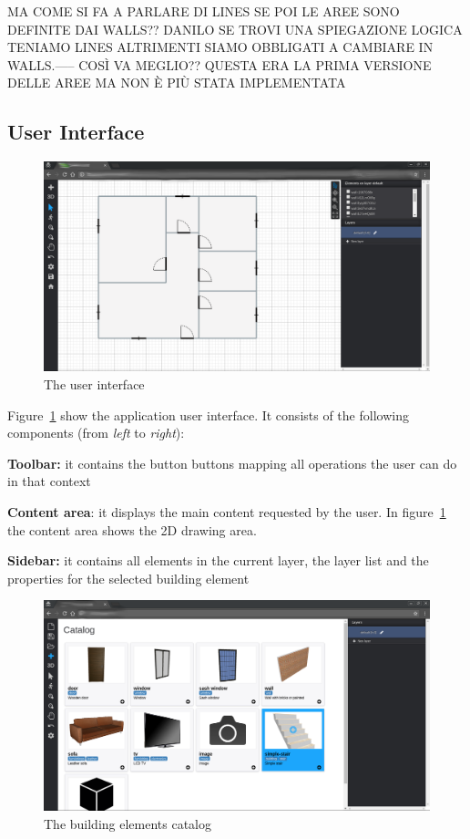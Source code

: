 MA COME SI FA A PARLARE DI LINES SE POI LE AREE SONO DEFINITE DAI WALLS?? DANILO SE TROVI UNA SPIEGAZIONE LOGICA TENIAMO LINES ALTRIMENTI SIAMO OBBLIGATI A CAMBIARE IN WALLS.----- COS\`I VA MEGLIO?? QUESTA ERA LA PRIMA VERSIONE DELLE AREE MA NON \`E PI\`U STATA IMPLEMENTATA


\subsection{User Interface}\label{ssec:ui}

\begin{figure}[htb]
\centering
\includegraphics[width=\linewidth]{contents/images/fig2d}
\caption{The user interface}
\label{fig2D}
\end{figure}

Figure~\ref{fig2D} show the application user interface. It consists of the following components (from \textit{left} to \textit{right}):

\textbf{Toolbar:} it contains the button buttons mapping all operations the user can do in that context

\textbf{Content area}: it displays the main content requested by the user. In figure~\ref{fig2D} the content area shows the 2D drawing area.

\textbf{Sidebar:} it contains all elements in the current layer, the layer list and the properties for the selected building element\\

\begin{figure}[htb]
\centering
\includegraphics[width=\linewidth]{contents/images/figcatalog}
\caption{The building elements catalog}
\label{figCatalogo}
\end{figure}


